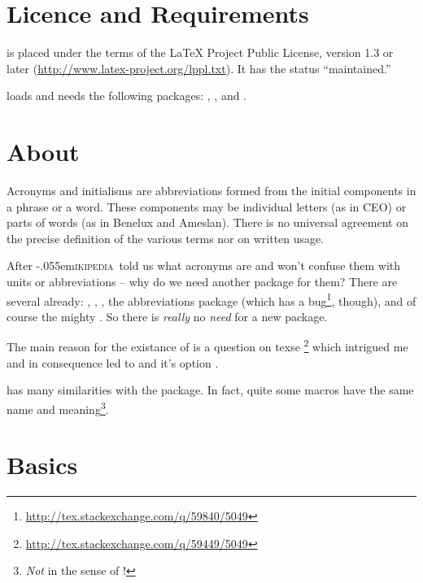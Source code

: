 \documentclass[DIV10,toc=index,toc=bib]{cnpkgdoc}
\newcommand*\wikipedia{\libertineGlyph{W.alt}\kern-.055em\textsc{ikipedia}}
\begin{document}
\newpage
\section{Licence and Requirements}
\acro is placed under the terms of the LaTeX Project Public License,
version 1.3 or later (\url{http://www.latex-project.org/lppl.txt}).
It has the status ``maintained.''

\acro loads and needs the following packages: ,
,  and .

\section{About}
\begin{zitat}
 Acronyms and initialisms are abbreviations formed from the initial components
 in a phrase or a word. These components may be individual letters (as in CEO)
 or parts of words (as in Benelux and Ameslan). There is no universal agreement
 on the precise definition of the various terms nor on written usage.
\end{zitat}
After \wikipedia\ told us what acronyms are and won't confuse them with units or
abbreviations -- why do we need another package for them? There are several
already:  \cite{acronym},  \cite{acromake},
 \cite{acroterm}, the abbreviations package 
\cite{abbrevs} (which has a bug\footnote{\url{http://tex.stackexchange.com/q/59840/5049}},
though), and of course the mighty  \cite{glossaries}. So there
is \emph{really} no \emph{need} for a new package.

The main reason for the existance of \acro is a question on \acs{texse}%
\footnote{\url{http://tex.stackexchange.com/q/59449/5049}} which intrigued me
and in consequence led to \acro and it's option .

\acro has many similarities with the  package. In fact, quite
some macros have the same name and meaning\footnote{\emph{Not} in the sense of
\code{\textbackslash\textcolor{code}{meaning}}!}.

\section{Basics}
\end{document}
